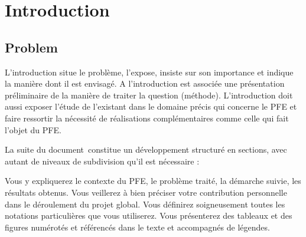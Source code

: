 
\chapter{Introduction} %

\label{Chapter1} %

\section{Problem}

L'introduction situe le problème, l'expose, insiste sur son importance et indique la manière dont il est envisagé. A l'introduction est associée une  présentation préliminaire de la manière de traiter la question (méthode). L'introduction doit aussi exposer l’étude de l’existant dans le domaine précis qui concerne le PFE et faire ressortir la nécessité de réalisations complémentaires comme celle qui fait l'objet du PFE.

La suite du document constitue un développement structuré en sections, avec autant de niveaux de subdivision qu’il est nécessaire :

Vous y expliquerez le contexte du PFE, le problème traité, la démarche suivie, les résultats obtenus. Vous veillerez à bien préciser votre contribution personnelle dans le déroulement du projet global.
Vous définirez soigneusement toutes les notations particulières que vous utiliserez. Vous présenterez des tableaux et des figures numérotés et référencés dans le texte et accompagnés de légendes.
